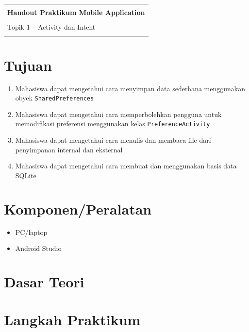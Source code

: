 \documentclass{scrartcl}
\begin{document}
	
	\begin{center}
		\begin{tabu} to \linewidth {X[c]}
			\toprule
			\\
			\LARGE{\textbf{Handout Praktikum Mobile Application}} \\
			\\
			\large{Topik 1 -- Activity dan Intent} \\
			\\
			\bottomrule
		\end{tabu}
	\end{center}
	
	\tableofcontents
	
	\section{Tujuan}
	
	\begin{enumerate}
		\item Mahasiswa dapat mengetahui cara menyimpan data sederhana menggunakan obyek \texttt{SharedPreferences}
		\item Mahasiswa dapat mengetahui cara memperbolehkan pengguna untuk memodifikasi preferensi menggunakan kelas \texttt{PreferenceActivity}
		\item Mahasiswa dapat mengetahui cara menulis dan membaca file dari penyimpanan internal dan eksternal
		\item Mahasiswa dapat mengetahui cara membuat dan menggunakan basis data SQLite
	\end{enumerate}
	
	\section{Komponen/Peralatan}
	
	\begin{itemize}
		\item PC/laptop
		\item Android Studio
	\end{itemize}
	
	\section{Dasar Teori}
	
	\section{Langkah Praktikum}
	
\end{document}
